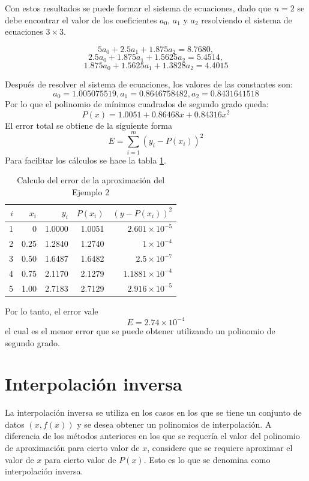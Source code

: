 \begin{example}
{	Con estos resultados se puede formar el sistema de ecuaciones, dado que $n=2$ se debe encontrar el valor de los coeficientes
	$a_0$, $a_1$ y $a_2$ resolviendo el sistema de ecuaciones $3\times 3$.
 
	$$5a_0 + 2.5a_1 + 1.875a_2 = 8.7680,$$
	$$2.5a_0 + 1.875a_1 + 1.5625a_2 = 5.4514,$$
	$$1.875a_0 + 1.5625a_1 + 1.3828a_2 = 4.4015$$  
  
	Después de resolver el sistema de ecuaciones, los valores de las constantes son:
	$$a_0 = 1.005075519, a_1 = 0.8646758482, a_2 = 0.8431641518$$
	Por lo que el polinomio de mínimos cuadrados de segundo grado queda:
	$$P(x) = 1.0051 + 0.86468x + 0.84316x^2$$
	El error total se obtiene de la siguiente forma
	$$E = \sum_{i=1}^m (y_i - P(x_i))^2$$
	Para facilitar los cálculos se hace la tabla \ref{table:minimosCuadrados4}.
	\begin{table}[ht]
      \begin{center}
		\begin{tabular}{|r|r|r|r|r|}
	  		\hline
	  		\rowcolor[gray]{0.9} $i$ & $x_i$ & $y_i$ & $P(x_i)$ & $(y-P(x_i))^2$\\\hline
	      		1 & 0 & 1.0000 & 1.0051 & $2.601\times 10^{-5}$\\
	      		2 & 0.25 & 1.2840 & 1.2740 & $1\times 10^{-4}$\\
	      		3 & 0.50 & 1.6487 & 1.6482 & $2.5\times 10^{-7}$\\
	      		4 & 0.75 & 2.1170 & 2.1279 & $1.1881\times 10^{-4}$\\
	      		5 & 1.00 & 2.7183 & 2.7129 & $2.916\times 10^{-5}$\\
	      		\hline
			\end{tabular}
			\caption{Calculo del error de la aproximación del Ejemplo 2}
			\label{table:minimosCuadrados4}
      \end{center}
    \end{table}	
	Por lo tanto, el error vale
	$$E = 2.74\times 10^{-4}$$
	el cual es el menor error que se puede obtener utilizando un polinomio de segundo grado.  
}\end{example}


\section{Interpolación inversa}

La interpolación inversa se utiliza en los casos en los que se tiene un conjunto de datos $(x,f(x))$ y se desea obtener un polinomios de interpolación.
A diferencia de los métodos anteriores en los que se requería el valor del polinomio de aproximación para cierto valor de $x$, considere que se requiere 
aproximar el valor de $x$ para cierto valor de $P(x)$. Esto es lo que se denomina como interpolación inversa.

